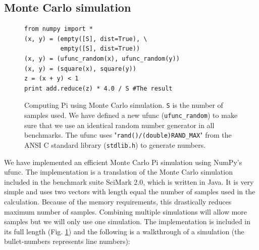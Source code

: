 \documentclass[10pt]{article}
\begin{document}
\subsection{Monte Carlo simulation}
\begin{figure}
\begin{lstlisting}
from numpy import *
(x, y) = (empty([S], dist=True), \
		  empty([S], dist=True))
(x, y) = (ufunc_random(x), ufunc_random(y))
(x, y) = (square(x), square(y))
z = (x + y) < 1
print add.reduce(z) * 4.0 / S #The result
\end{lstlisting}
 \caption{Computing Pi using Monte Carlo simulation. \texttt{S} is the number of samples used. We have defined a new ufunc (\texttt{ufunc\_random}) to make sure that we use an identical random number generator in all benchmarks. The ufunc uses "\texttt{rand()/(double)RAND\_MAX}" from the ANSI C standard library (\texttt{stdlib.h}) to generate numbers.}
 \label{lst:montecarlo}
\end{figure}

We have implemented an efficient Monte Carlo Pi simulation using NumPy's ufunc. The implementation is a translation of the Monte Carlo simulation included in the benchmark suite SciMark 2.0\cite{SciMark}, which is written in Java. It is very simple and uses two vectors with length equal the number of samples used in the calculation. Because of the memory requirements, this drastically reduces maximum number of samples. Combining multiple simulations will allow more samples but we will only use one simulation. The implementation is included in its full length (Fig. \ref{lst:montecarlo}) and the following is a walkthrough of a simulation (the bullet-numbers represents line numbers):
\end{document}
